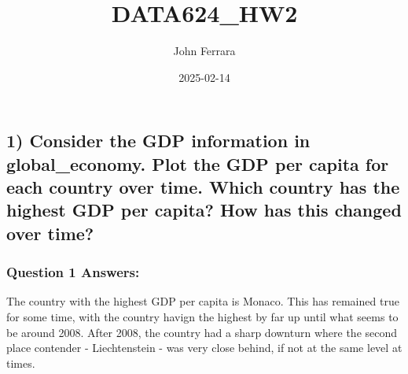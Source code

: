 \documentclass[
]{article}
\title{DATA624\_HW2}
\author{John Ferrara}
\date{2025-02-14}
\newenvironment{Shaded}{\begin{snugshade}}{\end{snugshade}}
\newcommand{\CommentTok}[1]{\textcolor[rgb]{0.56,0.35,0.01}{\textit{#1}}}
\newcommand{\DocumentationTok}[1]{\textcolor[rgb]{0.56,0.35,0.01}{\textbf{\textit{#1}}}}
\newcommand{\FunctionTok}[1]{\textcolor[rgb]{0.13,0.29,0.53}{\textbf{#1}}}
\newcommand{\NormalTok}[1]{#1}
\newcommand{\OtherTok}[1]{\textcolor[rgb]{0.56,0.35,0.01}{#1}}
\newcommand{\SpecialCharTok}[1]{\textcolor[rgb]{0.81,0.36,0.00}{\textbf{#1}}}
\begin{document}
\maketitle

\subsection{1) Consider the GDP information in global\_economy. Plot the
GDP per capita for each country over time. Which country has the highest
GDP per capita? How has this changed over
time?}\label{consider-the-gdp-information-in-global_economy.-plot-the-gdp-per-capita-for-each-country-over-time.-which-country-has-the-highest-gdp-per-capita-how-has-this-changed-over-time}

\subsubsection{Question 1 Answers:}\label{question-1-answers}

The country with the highest GDP per capita is Monaco. This has remained
true for some time, with the country havign the highest by far up until
what seems to be around 2008. After 2008, the country had a sharp
downturn where the second place contender - Liechtenstein - was very
close behind, if not at the same level at times.

\begin{Shaded}
\end{Shaded}
\end{document}
